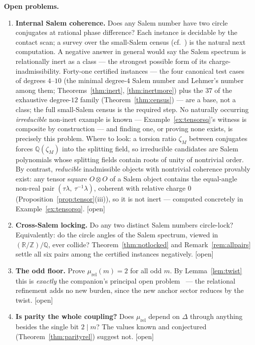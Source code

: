 \documentclass[11pt]{article}
\theoremstyle{plain}
\theoremstyle{definition}
\theoremstyle{remark}
\newcommand{\Q}{\mathbb{Q}}
\newcommand{\Z}{\mathbb{Z}}
\newcommand{\R}{\mathbb{R}}
\newcommand{\Op}{\textnormal{[open]}}
\begin{document}
\medskip
\noindent\textbf{Open problems.}
\begin{enumerate}
\item[(P1)] \textbf{Internal Salem coherence.} Does any Salem number have two
circle conjugates at rational phase difference? Each instance is decidable by
the contact scan; a survey over the small-Salem census
(cf.~\cite{Boyd1977, Mossinghoff}) is the natural next
computation. A negative answer in general would say the Salem spectrum is
relationally inert as a class --- the strongest possible form of its
charge-inadmissibility. Forty-one certified instances --- the four canonical
test cases of degrees $4$--$10$ (the minimal degree-$4$ Salem number and
Lehmer's number among them; Theorems~\ref{thm:inert}, \ref{thm:inertmore})
plus the $37$ of the exhaustive degree-$12$ family
(Theorem~\ref{thm:census}) --- are a base, not a class; the full small-Salem
census is the required step. No naturally occurring \emph{irreducible}
non-inert example is known --- Example~\ref{ex:tensorsq}'s witness is
composite by construction --- and finding one, or proving none exists, is
precisely this problem. Where to look: a torsion ratio $\zeta_M$ between
conjugates forces $\Q(\zeta_M)$ into the splitting field, so irreducible
candidates are Salem polynomials whose splitting fields contain roots of
unity of nontrivial order. By contrast, \emph{reducible} inadmissible
objects with nontrivial coherence provably exist: any tensor square
$O\otimes O$ of a Salem object contains the equal-angle non-real pair
$(\tau\lambda,\ \tau^{-1}\lambda)$, coherent with relative charge $0$
(Proposition~\ref{prop:tensor}(iii)), so it is not inert --- computed
concretely in Example~\ref{ex:tensorsq}. \Op
\item[(P2)] \textbf{Cross-Salem locking.} Do any two distinct Salem numbers
circle-lock? Equivalently: do the circle angles of the Salem spectrum, viewed in
$(\R/\Z)/\Q$, ever collide? Theorem~\ref{thm:notlocked} and
Remark~\ref{rem:allpairs} settle all six pairs among the certified instances
negatively. \Op
\item[(P3)] \textbf{The odd floor.} Prove $\mu_{\mathrm{rel}}(m)=2$ for all odd
$m$. By Lemma~\ref{lem:twist} this is \emph{exactly} the companion's principal
open problem~\cite[\S8]{CMC} --- the relational refinement adds no new burden,
since the new anchor sector reduces by the twist. \Op
\item[(P4)] \textbf{Is parity the whole coupling?} Does
$\mu_{\mathrm{rel}}$ depend on $\Delta$ through anything besides the single bit
$2\mid m$? The values known and conjectured (Theorem~\ref{thm:parityrel})
suggest not. \Op
\end{enumerate}
\end{document}
